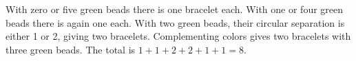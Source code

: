 With zero or five green beads there is one bracelet each. With one or four green beads there is again one each. With two green beads, their circular separation is either 1 or 2, giving two bracelets. Complementing colors gives two bracelets with three green beads. The total is $1+1+2+2+1+1=\boxed 8$.
